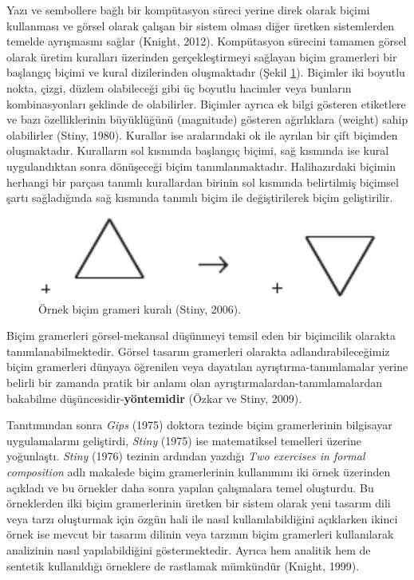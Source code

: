 \documentclass[12pt,turkish,a4paperpaper,]{report}
\begin{document}
Yazı ve sembollere bağlı bir kompütasyon süreci yerine direk olarak
biçimi kullanması ve görsel olarak çalışan bir sistem olması diğer
üretken sistemlerden temelde ayrışmasını sağlar (Knight, 2012).
Kompütasyon sürecini tamamen görsel olarak üretim kuralları üzerinden
gerçekleştirmeyi sağlayan biçim gramerleri bir başlangıç biçimi ve kural
dizilerinden oluşmaktadır (Şekil \ref{shapegrammarrule}). Biçimler iki
boyutlu nokta, çizgi, düzlem olabileceği gibi üç boyutlu hacimler veya
bunların kombinasyonları şeklinde de olabilirler. Biçimler ayrıca ek
bilgi gösteren etiketlere ve bazı özelliklerinin büyüklüğünü (magnitude)
gösteren ağırlıklara (weight) sahip olabilirler (Stiny, 1980). Kurallar
ise aralarındaki ok ile ayrılan bir çift biçimden oluşmaktadır.
Kuralların sol kısmında başlangıç biçimi, sağ kısmında ise kural
uygulandıktan sonra dönüşeceği biçim tanımlanmaktadır. Halihazırdaki
biçimin herhangi bir parçası tanımlı kurallardan birinin sol kısmında
belirtilmiş biçimsel şartı sağladığında sağ kısmında tanımlı biçim ile
değiştirilerek biçim geliştirilir.

\begin{figure}
\centering
\includegraphics[width=1\textwidth,height=\textheight]{source/figures/shape_grammar_rule.pdf}
\caption{Örnek biçim grameri kuralı (Stiny, 2006).
\label{shapegrammarrule}}
\end{figure}

Biçim gramerleri görsel-mekansal düşünmeyi temsil eden bir biçimcilik
olarakta tanımlanabilmektedir. Görsel tasarım gramerleri olarakta
adlandırabileceğimiz biçim gramerleri dünyaya öğrenilen veya dayatılan
ayrıştırma-tanımlamalar yerine belirli bir zamanda pratik bir anlamı
olan ayrıştırmalardan-tanımlamalardan bakabilme
düşüncesidir-\textbf{yöntemidir} (Özkar ve Stiny, 2009).

Tanıtımından sonra \emph{Gips} (1975) doktora tezinde biçim
gramerlerinin bilgisayar uygulamalarını geliştirdi, \emph{Stiny} (1975)
ise matematiksel temelleri üzerine yoğunlaştı. \emph{Stiny} (1976)
tezinin ardından yazdığı \emph{Two exercises in formal composition} adlı
makalede biçim gramerlerinin kullanımını iki örnek üzerinden açıkladı ve
bu örnekler daha sonra yapılan çalışmalara temel oluşturdu. Bu
örneklerden ilki biçim gramerlerinin üretken bir sistem olarak yeni
tasarım dili veya tarzı oluşturmak için özgün hali ile nasıl
kullanılabildiğini açıklarken ikinci örnek ise mevcut bir tasarım
dilinin veya tarzının biçim gramerleri kullanılarak analizinin nasıl
yapılabildiğini göstermektedir. Ayrıca hem analitik hem de sentetik
kullanıldığı örneklere de rastlamak mümkündür (Knight, 1999).
\end{document}
